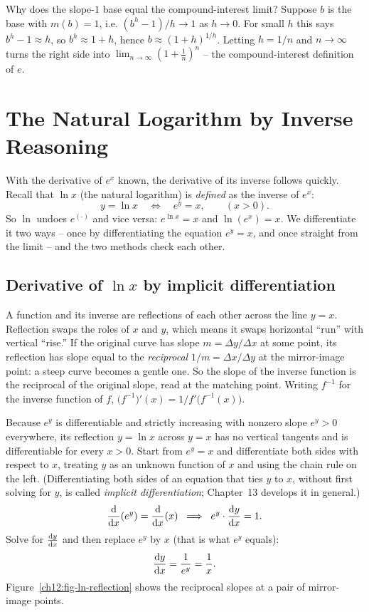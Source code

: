 \begin{connectionbox}
Why does the slope-$1$ base equal the compound-interest limit? Suppose $b$ is
the base with $m(b)=1$, i.e.
$(b^h-1)/h \to 1$ as $h\to 0$. For small $h$ this says $b^h - 1 \approx h$,
so $b^h \approx 1+h$, hence $b \approx (1+h)^{1/h}$. Letting $h = 1/n$ and
$n\to\infty$ turns the right side into $\lim_{n\to\infty}(1+\tfrac1n)^n$ --
the compound-interest definition of $e$.
\end{connectionbox}

\section{The Natural Logarithm by Inverse Reasoning}
\label{ch12:ln}

With the derivative of $e^x$ known, the derivative of its inverse follows quickly. Recall that
$\ln x$ (the natural logarithm) is \emph{defined} as the inverse of $e^x$:
\[
   y = \ln x \quad\Longleftrightarrow\quad e^y = x,\qquad (x>0).
\]
So $\ln$ undoes $e^{(\cdot)}$ and vice versa: $e^{\ln x} = x$ and
$\ln(e^x)=x$. We differentiate it two ways -- once by differentiating the
equation $e^y = x$, and once straight from the limit -- and the two methods
check each other.

\subsection{Derivative of $\ln x$ by implicit differentiation}

\begin{intuitionbox}
A function and its inverse are reflections of each other across the line
$y=x$. Reflection swaps the roles of $x$ and $y$, which means it swaps
horizontal ``run'' with vertical ``rise.'' If the original curve has slope
$m = \Delta y / \Delta x$ at some point, its reflection has slope equal to the
\emph{reciprocal} $1/m = \Delta x / \Delta y$ at the mirror-image point: a
steep curve becomes a gentle one. So the slope of the inverse function is the
reciprocal of the original slope, read at the matching point. Writing
$f^{-1}$ for the inverse function of $f$,
$\big(f^{-1}\big)'(x) = 1 / f'\!\big(f^{-1}(x)\big)$.
\end{intuitionbox}

Because $e^y$ is differentiable and strictly increasing with nonzero slope $e^y > 0$
everywhere, its reflection $y = \ln x$ across $y=x$ has no vertical tangents and
is differentiable for every $x>0$. Start from $e^y = x$ and differentiate both
sides with respect to $x$, treating $y$ as an unknown function of $x$ and using
the chain rule on the left. (Differentiating both sides of an equation that
ties $y$ to $x$, without first solving for $y$, is called \emph{implicit
differentiation}; Chapter~13 develops it in general.)
\[
   \frac{\mathrm{d}}{\mathrm{d} x}\!\left(e^y\right) = \frac{\mathrm{d}}{\mathrm{d} x}\!\left(x\right)
   \;\;\Longrightarrow\;\;
   e^y \cdot \frac{\mathrm{d} y}{\mathrm{d} x} = 1.
\]
Solve for $\frac{\mathrm{d} y}{\mathrm{d} x}$ and then replace $e^y$ by $x$ (that is what $e^y$
equals):
\[
   \frac{\mathrm{d} y}{\mathrm{d} x} = \frac{1}{e^y} = \frac{1}{x}.
\]
Figure~\ref{ch12:fig-ln-reflection} shows the reciprocal slopes at a pair of
mirror-image points.

